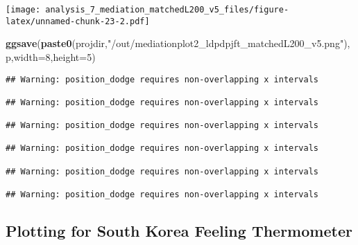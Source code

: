 \documentclass[
]{article}
\newenvironment{Shaded}{\begin{snugshade}}{\end{snugshade}}
\newcommand{\DataTypeTok}[1]{\textcolor[rgb]{0.13,0.29,0.53}{#1}}
\newcommand{\DecValTok}[1]{\textcolor[rgb]{0.00,0.00,0.81}{#1}}
\newcommand{\KeywordTok}[1]{\textcolor[rgb]{0.13,0.29,0.53}{\textbf{#1}}}
\newcommand{\NormalTok}[1]{#1}
\newcommand{\StringTok}[1]{\textcolor[rgb]{0.31,0.60,0.02}{#1}}
\begin{document}
\texttt{[image: analysis\_7\_mediation\_matchedL200\_v5\_files/figure-latex/unnamed-chunk-23-2.pdf]}

\begin{Shaded}
\begin{Highlighting}[]
\KeywordTok{ggsave}\NormalTok{(}\KeywordTok{paste0}\NormalTok{(projdir,}\StringTok{"/out/mediationplot2_ldpdpjft_matchedL200_v5.png"}\NormalTok{),p,}\DataTypeTok{width=}\DecValTok{8}\NormalTok{,}\DataTypeTok{height=}\DecValTok{5}\NormalTok{)}
\end{Highlighting}
\end{Shaded}

\begin{verbatim}
## Warning: position_dodge requires non-overlapping x intervals

## Warning: position_dodge requires non-overlapping x intervals

## Warning: position_dodge requires non-overlapping x intervals

## Warning: position_dodge requires non-overlapping x intervals

## Warning: position_dodge requires non-overlapping x intervals

## Warning: position_dodge requires non-overlapping x intervals
\end{verbatim}

\hypertarget{plotting-for-south-korea-feeling-thermometer}{%
\subsection{Plotting for South Korea Feeling
Thermometer}\label{plotting-for-south-korea-feeling-thermometer}}
\end{document}
